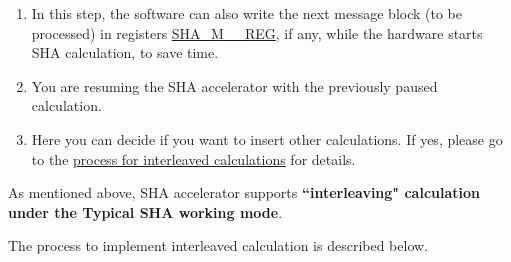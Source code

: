 \documentclass[main\_\_EN.tex]{subfiles}
\begin{document}
\begin{tiplisting}\label{others:sha-note-typical-sha}
\vspace{-2.5em}
\begin{enumerate}
\item In this step, the software can also write the next message block (to be processed) in registers \hyperref[regdesc:SHAMNREG]{SHA\_M\_\_REG}, if any, while the hardware starts SHA calculation, to save time.
\item You are resuming the SHA accelerator with the previously paused calculation.
\item Here you can decide if you want to insert other calculations. If yes, please go to the \hyperref[others:sha-interleaved]{process for interleaved calculations} for details.
\end{enumerate} 
\end{tiplisting}

\label{others:sha-interleaved}As mentioned above, \chipname{} SHA accelerator supports \textbf{``interleaving" calculation under the Typical SHA working mode}. 

The process to implement interleaved calculation is described below.
\end{document}
